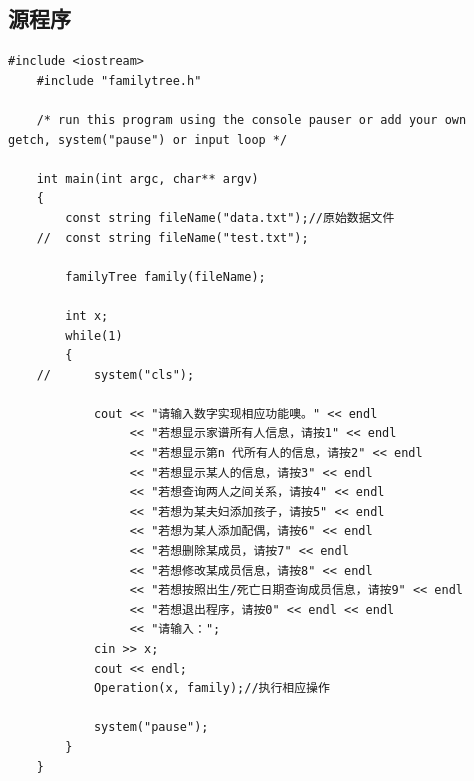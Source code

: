 \documentclass[a4paper,11pt,UTF8]{ctexart}
\begin{document}
\subsection{源程序}
\begin{lstlisting}[caption=main.cpp,captionpos=b]
    #include <iostream>
    #include "familytree.h"

    /* run this program using the console pauser or add your own getch, system("pause") or input loop */

    int main(int argc, char** argv)
    {
        const string fileName("data.txt");//原始数据文件
    //	const string fileName("test.txt");

        familyTree family(fileName);

        int x;
        while(1)
        {
    //		system("cls");

            cout << "请输入数字实现相应功能噢。" << endl
                 << "若想显示家谱所有人信息，请按1" << endl
                 << "若想显示第n 代所有人的信息，请按2" << endl
                 << "若想显示某人的信息，请按3" << endl
                 << "若想查询两人之间关系，请按4" << endl
                 << "若想为某夫妇添加孩子，请按5" << endl
                 << "若想为某人添加配偶，请按6" << endl
                 << "若想删除某成员，请按7" << endl
                 << "若想修改某成员信息，请按8" << endl
                 << "若想按照出生/死亡日期查询成员信息，请按9" << endl
                 << "若想退出程序，请按0" << endl << endl
                 << "请输入：";
            cin >> x;
            cout << endl;
            Operation(x, family);//执行相应操作

            system("pause");
        }
    }
\end{lstlisting}
\end{document}
